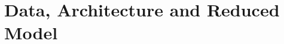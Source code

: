 \documentclass{article} %
\begin{document}











\vspace{-10pt}
\section{Data, Architecture and Reduced Model}
\vspace{-10pt}
\end{document}
